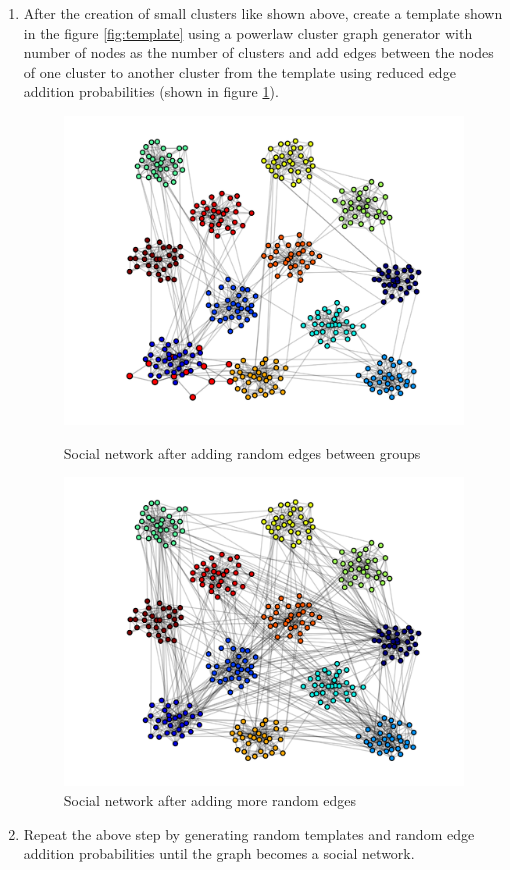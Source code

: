 \begin{enumerate}
\begin{figure}[H]
	\end{figure}
	\item
	After the creation of small clusters like shown above, create a template shown in the figure \ref{fig:template} using a powerlaw cluster graph generator with number of nodes as the number of clusters and add edges between the nodes of one cluster to another cluster from the template using reduced edge addition probabilities (shown in figure \ref{fig:moreedges}).
	\begin{figure}[H]
		\begin{minipage}{.5\textwidth}
			\centering
			\includegraphics[scale=0.22]{Images/datasetgen3.pdf}
			\caption{Social network after adding random edges between groups \label{fig:moreedges}}
		\end{minipage}
		\begin{minipage}{.5\textwidth}
			\centering
			\includegraphics[scale=0.22]{Images/datasetgen4.pdf}
			\caption{Social network after adding more random edges}
		\end{minipage}	
	\end{figure}
	\item
	Repeat the above step by generating random templates and random edge addition probabilities until the graph becomes a social network.
\end{enumerate}